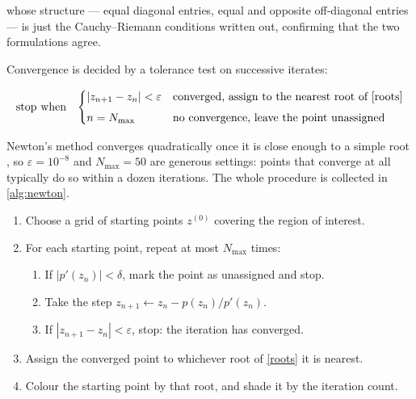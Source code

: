 whose structure — equal diagonal entries, equal and opposite off-diagonal
entries — is just the Cauchy–Riemann conditions written out, confirming that
the two formulations agree.

Convergence is decided by a tolerance test on successive iterates:

\begin{equation} \label{stop}
	\text{stop when} \; \; \;
	\begin{cases}
		|z_{n+1} - z_n| < \varepsilon & \text{converged, assign to the nearest root of \cref{roots}} \\[4pt]
		n = N_{\max}                  & \text{no convergence, leave the point unassigned}
	\end{cases}
\end{equation}

Newton's method converges quadratically once it is close enough to a simple
root \cite{numrecipes}, so $\varepsilon = 10^{-8}$ and $N_{\max} = 50$ are
generous settings: points that converge at all typically do so within a dozen
iterations. The whole procedure is collected in \cref{alg:newton}.

\begin{algorithm}[htbp]
	\caption{Newton iteration on a grid of starting points. The step is
	\cref{newton} and the stopping rule is \cref{stop}. Written as a generic
	fixed-point loop so it can be reused for any $p(z)$ by changing one line.}
	\label{alg:newton}
	\begin{enumerate}
		\itemsep2pt
		\item Choose a grid of starting points $z^{(0)}$ covering the region of interest.
		\item For each starting point, repeat at most $N_{\max}$ times:
		\begin{enumerate}
			\item If $|p'(z_n)| < \delta$, mark the point as unassigned and stop.
			\item Take the step $z_{n+1} \leftarrow z_n - p(z_n)/p'(z_n)$.
			\item If $|z_{n+1} - z_n| < \varepsilon$, stop: the iteration has converged.
		\end{enumerate}
		\item Assign the converged point to whichever root of \cref{roots} it is nearest.
		\item Colour the starting point by that root, and shade it by the iteration count.
	\end{enumerate}
\end{algorithm}

